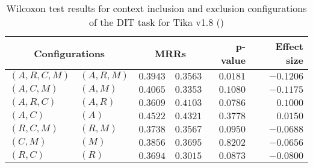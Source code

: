 
\begin{table}
\begin{spacing}{1.2}
\centering
\caption{Wilcoxon test results for context inclusion and exclusion configurations of the DIT task for Tika v1.8 (\ctwo)}
\label{table:versus-wilcox-tika-dit-context}
\begin{tabular}{ll|rr|rr}
\toprule
      \multicolumn{2}{c|}{Configurations} &                \multicolumn{2}{c|}{MRRs} &             p-value & Effect size \\
\midrule
 $(A,R,C,M)$ &  $(A,R,M)$ &  $\bm{0.3943}$ &       $0.3563$ & $0.0181$ &   $-0.1206$ \\
   $(A,C,M)$ &    $(A,M)$ &  $\bm{0.4065}$ &       $0.3353$ & $0.1080$ &   $-0.1175$ \\
   $(A,R,C)$ &    $(A,R)$ &       $0.3609$ &  $\bm{0.4103}$ & $0.0786$ &    $0.1000$ \\
     $(A,C)$ &      $(A)$ &  $\bm{0.4522}$ &       $0.4321$ & $0.3778$ &    $0.0150$ \\
   $(R,C,M)$ &    $(R,M)$ &  $\bm{0.3738}$ &       $0.3567$ & $0.0950$ &   $-0.0688$ \\
     $(C,M)$ &      $(M)$ &  $\bm{0.3856}$ &       $0.3695$ & $0.8202$ &   $-0.0656$ \\
     $(R,C)$ &      $(R)$ &  $\bm{0.3694}$ &       $0.3015$ & $0.0873$ &   $-0.0800$ \\
\bottomrule
\end{tabular}

\end{spacing}
\end{table}

